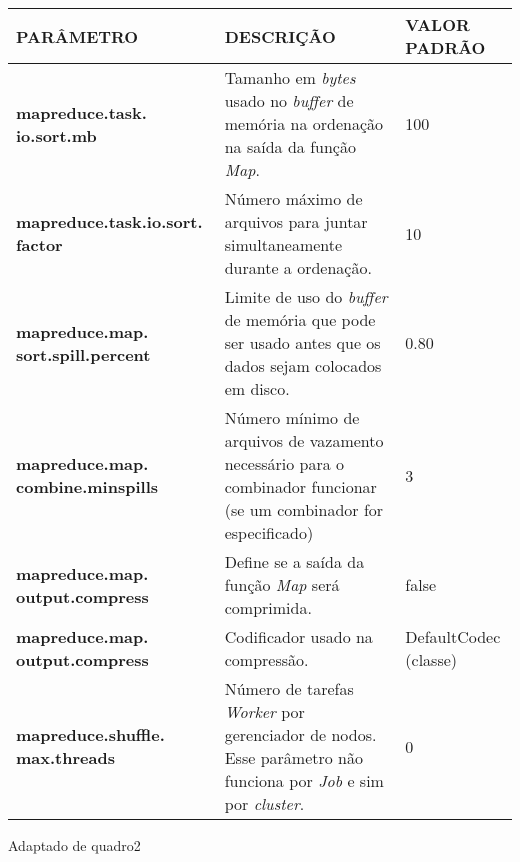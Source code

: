 {\footnotesize
  \centering
  \begin{tabular}{|p{30mm}|p{50mm}|p{35mm}|}\hline
    \textbf{PARÂMETRO}                         & \textbf{DESCRIÇÃO}                                                                                                                   & \textbf{VALOR PADRÃO} \\\hline
    \textbf{mapreduce.task. io.sort.mb}        & Tamanho em \textit{bytes} usado no \textit{buffer} de memória na ordenação na saída da função \textit{Map}.                          & 100                   \\\hline
    \textbf{mapreduce.task.io.sort. factor}    & Número máximo de arquivos para juntar simultaneamente durante a ordenação.                                                           & 10                    \\\hline
    \textbf{mapreduce.map. sort.spill.percent} & Limite de uso do \textit{buffer} de memória que pode ser usado antes que os dados sejam colocados em disco.                          & 0.80                  \\\hline
    \textbf{mapreduce.map. combine.minspills}  & Número mínimo de arquivos de vazamento necessário para o combinador funcionar (se um combinador for especificado)                    & 3                     \\\hline
    \textbf{mapreduce.map. output.compress}    & Define se a saída da função \textit{Map} será comprimida.                                                                            & false                 \\\hline
    \textbf{mapreduce.map. output.compress}    & Codificador usado na compressão.                                                                                                     & DefaultCodec (classe) \\\hline
    \textbf{mapreduce.shuffle. max.threads}    & Número de tarefas \textit{Worker} por gerenciador de nodos. Esse parâmetro não funciona por \textit{Job} e sim por \textit{cluster}. & 0                     \\\hline
  \end{tabular}}
{Adaptado de \cite{HadoopBook15}}{quadro2}{}{}

